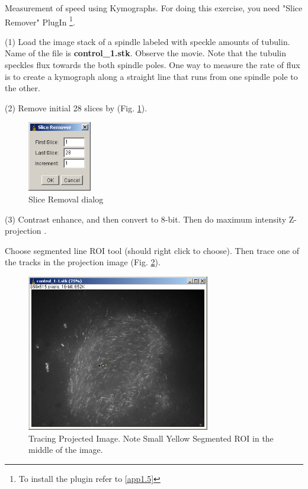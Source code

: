 \begin{indentexercise}{1}

Measurement of speed using Kymographs. For doing this exercise, you need "Slice Remover" PlugIn \footnote{ To install the plugin refer to \ref{app1.5}}. 

(1) Load the image stack of a spindle labeled with speckle amounts of tubulin. Name of the file is \textbf{control\_1.stk}. Observe the movie. Note that the tubulin speckles flux towards the both spindle
poles. One way to measure the rate of flux is to create a kymograph along a straight line that runs from one spindle pole to the other.

(2) Remove initial 28 slices by  (Fig. \ref{fig:img132}).

\begin{figure}[H]
\begin{center}
\includegraphics[width=2.778cm,height=3.069cm]{img/CMCIBasicCourse201102-img132.png}
\caption{ Slice Removal dialog}
\label{fig:img132}
\end{center}
\end{figure}


(3) Contrast enhance, and then convert to 8-bit. Then do maximum intensity Z-projection . 

Choose segmented line ROI tool (should right click to choose). Then trace one of the tracks in the projection image (Fig. \ref{fig:img133}).

\begin{figure}[htbp]
\begin{center}
\includegraphics[width=8cm]{img/CMCIBasicCourse201102-img133.png}
\caption{ Tracing Projected Image. Note Small Yellow Segmented ROI in the middle of the image.}
\label{fig:img133}
\end{center}
\end{figure}


\end{indentexercise}
